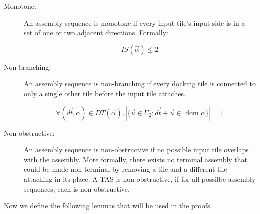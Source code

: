 \documentclass[12pt]{article}
\newcommand{\aSeq}{\overrightarrow{\alpha}}
\begin{document}
\begin{description}



    \item[Monotone:] An assembly sequence is monotone if every input tile's input side is in a set of one or two adjacent directions. Formally:

        \[IS(\aSeq) \leq 2\]

    \item[Non-branching:] An assembly sequence is non-branching if every docking tile is connected to only a single other tile before the input tile attaches. 

        \[ \forall (\vec{dt}, \alpha) \in DT(\aSeq), |\{\vec{u} \in U_2 : \vec{dt} + \vec{u} \in \text { dom } \alpha \} | = 1 \]

    \item[Non-obstructive:] An assembly sequence is non-obstructive if no possible input tile overlaps with the assembly. More formally, there exists no terminal assembly that could be made non-terminal by removing a tile and a different tile attaching in its place. A TAS is non-obstructive, if for all possilbe assembly sequences, each is non-obstructive.




\end{description}


Now we define the following lemmas that will be used in the proofs.
\end{document}
